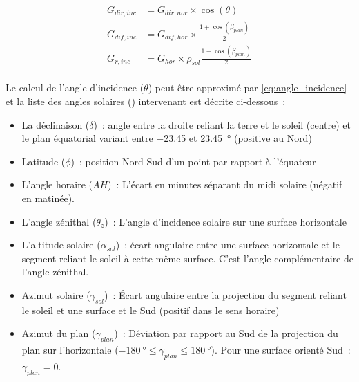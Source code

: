 \begin{equation}\label{eq:rayonnement_surf_incline}
    \begin{aligned}
        G_{dir, inc} &= G_{dir, nor} \times \cos(\theta) \\
        G_{dif, inc} &= G_{dif, hor} \times \frac{1 + \cos(\beta_{plan})}{2} \\
        G_{r, inc}   &= G_{hor} \times \rho_{sol} \frac{1 - \cos(\beta_{plan})}{2} \\
    \end{aligned}
\end{equation}

Le calcul de l’angle d’incidence ($\theta$) peut être approximé par \eqref{eq:angle_incidence}
\parencite{Cooper1969333,Duffie1980} et la liste des angles solaires
() intervenant est décrite ci-dessous~:
\begin{itemize}
    \item La déclinaison ($\delta$)~: angle entre la droite reliant la terre et le soleil
          (centre) et le plan équatorial variant entre \num{-23.45} et \SI{23.45}{\degree}
          (positive au Nord)
    \item Latitude ($\phi$)~: position Nord-Sud d’un point par rapport à l’équateur
    \item L’angle horaire ($AH$)~: L’écart en minutes séparant du midi solaire (négatif en matinée).
    \item L’angle zénithal ($\theta_{z}$)~: L’angle d’incidence solaire sur une surface horizontale
    \item L’altitude solaire ($\alpha_{sol}$)~: écart angulaire entre une surface horizontale et le segment reliant
          le soleil à cette même surface. C’est l’angle complémentaire de l’angle zénithal.
    \item Azimut solaire ($\gamma_{sol}$)~: Écart angulaire entre la projection du segment reliant
          le soleil et une surface et le Sud (positif dans le sens horaire)
    \item Azimut du plan ($\gamma_{plan}$)~: Déviation par rapport au Sud de la projection
          du plan sur l’horizontale ($\SI{-180}{\degree} \leq \gamma_{plan} \leq \SI{180}{\degree}$).
          Pour une surface orienté Sud~: $\gamma_{plan}=0$.
\end{itemize}


